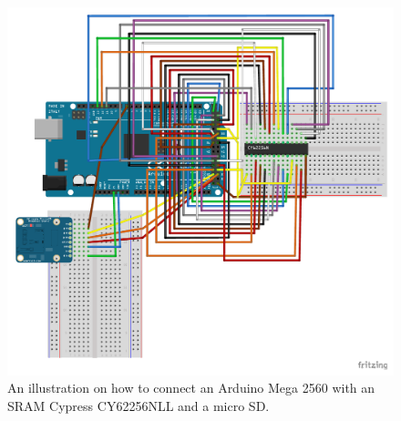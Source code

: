 \begin{figure}[tph!]
    \centerline{\includegraphics[width={\textwidth}]{images/CY62256-new-SD_bb}}
    \caption{An illustration on how to connect an Arduino Mega 2560 with an SRAM Cypress CY62256NLL and a micro SD.}
    \label{fig:cy62256nll_scheme_sd}
\end{figure}



